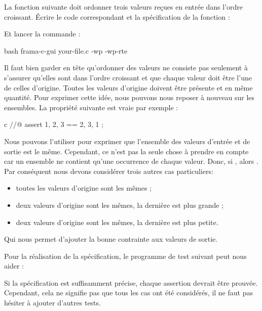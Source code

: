

La fonction suivante doit ordonner trois valeurs reçues en entrée dans
l'ordre croissant. Écrire le code correspondant et la spécification de la
fonction :



Et lancer la commande :


\begin{CodeBlock}{bash}
frama-c-gui your-file.c -wp -wp-rte
\end{CodeBlock}


Il faut bien garder en tête qu'ordonner des valeurs ne consiste pas seulement
à s'assurer qu'elles sont dans l'ordre croissant et que chaque valeur doit
être l'une de celles d'origine. Toutes les valeurs d'origine doivent être
présente et en même quantité. Pour exprimer cette idée, nous pouvons nous
reposer à nouveau sur les ensembles. La propriété suivante est vraie par
exemple :


\begin{CodeBlock}{c}
//@ assert { 1, 2, 3 } == { 2, 3, 1 };
\end{CodeBlock}


Nous pouvons l'utiliser pour exprimer que l'ensemble des valeurs d'entrée et
de sortie est le même. Cependant, ce n'est pas la seule chose à prendre en
compte car un ensemble ne contient qu'une occurrence de chaque valeur. Donc,
si , alors .
Par conséquent nous devons considérer trois autres cas particuliers:


\begin{itemize}
\item toutes les valeurs d'origine sont les mêmes ;
\item deux valeurs d'origine sont les mêmes, la dernière est plus grande ;
\item deux valeurs d'origine sont les mêmes, la dernière est plus petite.
\end{itemize}


Qui nous permet d'ajouter la bonne contrainte aux valeurs de sortie.


Pour la réalisation de la spécification, le programme de test suivant peut
nous aider :




Si la spécification est suffisamment précise, chaque assertion devrait être
prouvée. Cependant, cela ne signifie pas que tous les cas ont été considérés,
il ne faut pas hésiter à ajouter d'autres tests.
